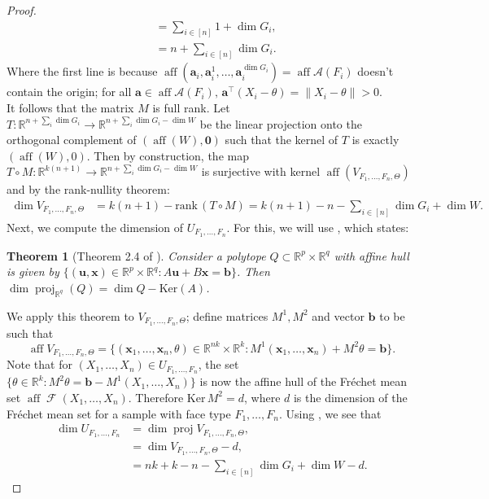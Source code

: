 \documentclass[10pt]{article}
\newtheorem*{theorem*}{Theorem}
\theoremstyle{definition}
\theoremstyle{remark}
\newcommand{\R}{\mathbb{R}}
\newcommand{\Ker}{\mathrm{Ker} \,}
\newcommand{\rank}{\mathrm{rank} \,}
\newcommand{\T}{\intercal}
\newcommand{\CType}{F_1,\dots,F_n}
\newcommand{\sample}{ X_1,\dots, X_n}
\DeclareMathOperator{\FMset}{\mathcal{F}}
\DeclareMathOperator{\aff}{aff}
\DeclareMathOperator{\proj}{proj}
\renewcommand{\vec}[1]{\mathbf{#1}}
\renewcommand{\ker}{\text{Ker}}
\newcommand{\A}{\mathcal{A}}
\begin{document}
\begin{proof}
\begin{align*}
			&= \textstyle \sum_{i \in [n]} 1+ \dim G_i, \\
			&= n + \textstyle \sum_{i \in [n]} \dim G_i.
		\end{align*}
		Where the first line is because $\aff (\vec a_i, \vec a_i^1, \dots, \vec a_i^{\dim G_i}) = \aff \A(F_i)$ doesn't contain the origin; for all $\vec a \in \aff \A(F_i), \, \vec a^\T (X_i-\theta) = \|X_i - \theta\| > 0$.\\    
		It follows that the matrix $M$ is full rank.  Let $T: \R^{n + \sum_i \dim G_i} \rightarrow \R^{n + \sum_i \dim G_i-\dim W}$ be the linear projection onto the orthogonal complement of $(\aff(W),\vec 0)$ such that the kernel of $T$ is exactly $(\aff(W),0)$. 
		Then by construction, the map $T \circ M: \R^{k(n+1)} \rightarrow \R^{n + \sum_i \dim G_i-\dim W}$ is surjective with kernel $\aff(V_{\CType,\Theta})$ and by the rank-nullity theorem:
		\begin{align*}
			\dim V_{\CType,\Theta} &= k(n+1) - \rank (T \circ M) = k(n+1) - n - \textstyle \sum_{i \in [n]} \dim G_i + \dim W.
		\end{align*}
		Next, we compute the dimension of $U_{\CType}$. For this, we will use \cite[Theorem 2.4]{balas1998dimension}, which states:
		\begin{theorem*}[Theorem 2.4 of \cite{balas1998dimension}]
			Consider a polytope $Q \subset \R^p \times \R^q$ with affine hull is given by $\{ (\vec u,\vec x) \in \R^p \times \R^q : A\vec u+B\vec x = \vec b\}$. Then $\dim \proj_{\R^q}(Q) = \dim Q - \ker(A)$.
		\end{theorem*}
		We apply this theorem to $V_{\CType,\Theta}$; define matrices $M^1, M^2$ and vector $\vec b$ to be such that
		\[
		\aff V_{\CType,\Theta} = \{(\vec x_1, \dots, \vec x_n,\theta) \in \R^{nk} \times \R^{k} :  M^1 (\vec x_1, \dots, \vec x_n) + M^2 \theta = \vec b \}.
		\]
		Note that for $(X_1, \dots, X_n) \in U_{\CType}$, the set $\{\theta \in \R^k : M^2 \theta = \vec b - M^1(\sample) \}$ is now the affine hull of the Fr\'echet mean set $\aff \FMset(\sample)$. Therefore $\Ker M^2 = d$, where $d$ is the dimension of the Fr\'echet mean set for a sample with face type $\CType$. Using \cite[Theorem 2.4]{balas1998dimension}, we see that
		\begin{align}
			\dim U_{\CType} &= \dim \proj V_{\CType,\Theta}, \nonumber\\
			&= \dim V_{\CType,\Theta} - d, \nonumber\\
			&= nk + k - n - \textstyle\sum_{i \in [n]} \dim G_i + \dim W - d.\label{eq:init_U_dim}
		\end{align}

\end{proof}
\end{document}

